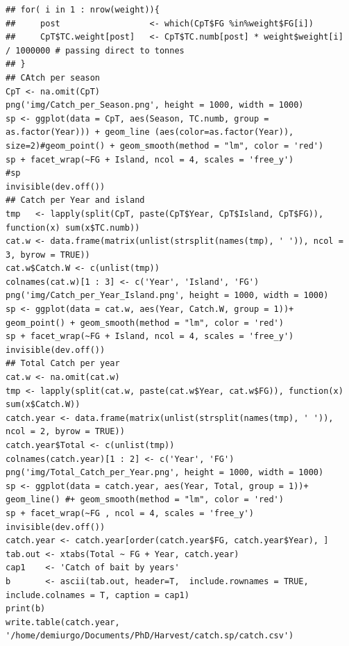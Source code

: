 \documentclass[11pt]{article}
\begin{document}
\begin{verbatim}
## for( i in 1 : nrow(weight)){
##     post                  <- which(CpT$FG %in%weight$FG[i])
##     CpT$TC.weight[post]   <- CpT$TC.numb[post] * weight$weight[i]  / 1000000 # passing direct to tonnes
## }
## CAtch per season
CpT <- na.omit(CpT)
png('img/Catch_per_Season.png', height = 1000, width = 1000)
sp <- ggplot(data = CpT, aes(Season, TC.numb, group = as.factor(Year))) + geom_line (aes(color=as.factor(Year)), size=2)#geom_point() + geom_smooth(method = "lm", color = 'red')
sp + facet_wrap(~FG + Island, ncol = 4, scales = 'free_y')
#sp
invisible(dev.off())
## Catch per Year and island
tmp   <- lapply(split(CpT, paste(CpT$Year, CpT$Island, CpT$FG)), function(x) sum(x$TC.numb))
cat.w <- data.frame(matrix(unlist(strsplit(names(tmp), ' ')), ncol = 3, byrow = TRUE))
cat.w$Catch.W <- c(unlist(tmp))
colnames(cat.w)[1 : 3] <- c('Year', 'Island', 'FG')
png('img/Catch_per_Year_Island.png', height = 1000, width = 1000)
sp <- ggplot(data = cat.w, aes(Year, Catch.W, group = 1))+ geom_point() + geom_smooth(method = "lm", color = 'red')
sp + facet_wrap(~FG + Island, ncol = 4, scales = 'free_y')
invisible(dev.off())
## Total Catch per year
cat.w <- na.omit(cat.w)
tmp <- lapply(split(cat.w, paste(cat.w$Year, cat.w$FG)), function(x) sum(x$Catch.W))
catch.year <- data.frame(matrix(unlist(strsplit(names(tmp), ' ')), ncol = 2, byrow = TRUE))
catch.year$Total <- c(unlist(tmp))
colnames(catch.year)[1 : 2] <- c('Year', 'FG')
png('img/Total_Catch_per_Year.png', height = 1000, width = 1000)
sp <- ggplot(data = catch.year, aes(Year, Total, group = 1))+ geom_line() #+ geom_smooth(method = "lm", color = 'red')
sp + facet_wrap(~FG , ncol = 4, scales = 'free_y')
invisible(dev.off())
catch.year <- catch.year[order(catch.year$FG, catch.year$Year), ]
tab.out <- xtabs(Total ~ FG + Year, catch.year)
cap1    <- 'Catch of bait by years'
b       <- ascii(tab.out, header=T,  include.rownames = TRUE, include.colnames = T, caption = cap1)
print(b)
write.table(catch.year, '/home/demiurgo/Documents/PhD/Harvest/catch.sp/catch.csv')
\end{verbatim}
\end{document}
